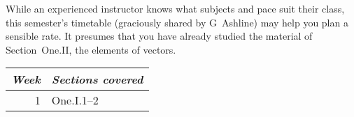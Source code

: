 {While an experienced instructor knows what subjects and
pace suit their class, this semester's timetable 
(graciously shared by G~Ashline)
may help you plan a sensible rate.
It presumes that you have already studied the material of 
Section~One.II, the elements of vectors.
\begin{center} 
   \begin{tabular}{r|l}
      \multicolumn{1}{r}{\textit{Week}}  
       &\textit{Sections covered}        \\ \hline
       1    &One.I.1--2                 \\

\end{tabular}
\end{center}}
